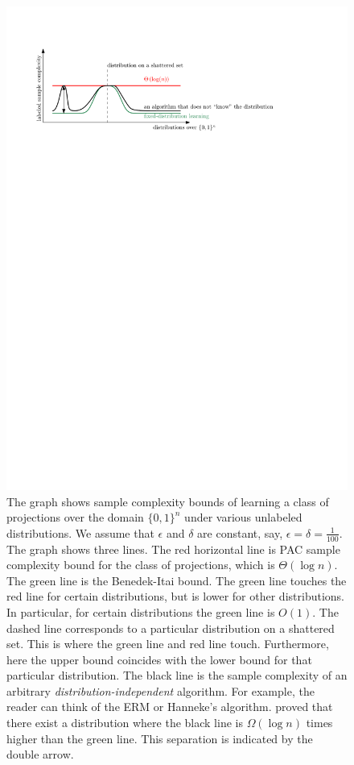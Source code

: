\documentclass[12pt]{colt2019}
\begin{document}
\begin{figure}
\centering
\includegraphics[scale=1.0]{figure}
\caption{The graph shows sample complexity bounds of learning a class of
projections over the domain $\{0,1\}^n$ under various unlabeled distributions.
We assume that $\epsilon$ and $\delta$ are constant, say, $\epsilon = \delta =
\frac{1}{100}$. The graph shows three lines. The red horizontal line is PAC
sample complexity bound for the class of projections, which is $\Theta(\log n)$.
The green line is the Benedek-Itai bound. The green line touches the red line
for certain distributions, but is lower for other distributions. In particular,
for certain distributions the green line is $O(1)$. The dashed line corresponds
to a particular distribution on a shattered set. This is where the green line
and red line touch. Furthermore, here the upper bound coincides with the lower
bound for that particular distribution. The black line is the sample complexity
of an arbitrary \emph{distribution-independent} algorithm. For example, the
reader can think of the ERM or Hanneke's algorithm.
\cite{Golovnev-Pal-Szorenyi-2019} proved that there exist a distribution where
the black line is $\Omega(\log n)$ times higher than the green line. This
separation is indicated by the double arrow.}
\label{figure:sample-complexity}
\end{figure}
\end{document}
